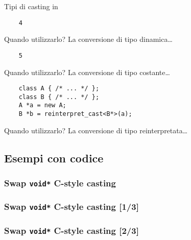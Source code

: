 \documentclass[xcolor={dvipsnames, svgnames, x11names, table}, 10pt]{beamer}
\begin{document}
\begin{frame}[t, fragile]{Tipi di casting in \cplusplus}
\begin{overprint}
    \begin{verbatim}
    4
    \end{verbatim}
        
    \begin{block}{Quando utilizzarlo?}
    La conversione di tipo dinamica\dots
    \end{block}
    
    \begin{verbatim}
    5
    \end{verbatim}
        
    \begin{block}{Quando utilizzarlo?}
    La conversione di tipo costante\dots
    \end{block}
    
    \begin{verbatim}
    class A { /* ... */ };
    class B { /* ... */ };
    A *a = new A;
    B *b = reinterpret_cast<B*>(a);
    \end{verbatim}
    
    \begin{block}{Quando utilizzarlo?}
    La conversione di tipo reinterpretata\dots
    \end{block}
    \end{overprint}
    
\end{frame}

\subsection{Esempi con codice}

\subsubsection{Swap \texttt{void*} C-style casting}

\begin{frame}[t, fragile]

    \frametitle<1>{Swap \texttt{void*} C-style casting [1/3]}
    
    \frametitle<2>{Swap \texttt{void*} C-style casting [2/3]}

\end{frame}
\end{document}
